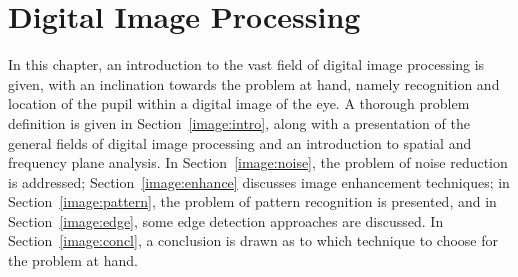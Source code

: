 
\chapter{Digital Image Processing}
\label{image}

In this chapter, an introduction to the vast field of digital image
processing is given, with an inclination towards the problem at hand,
namely recognition and location of the pupil within a digital image of
the eye.  A thorough problem definition is given in
Section~\ref{image:intro}, along with a presentation of the general
fields of digital image processing and an introduction to spatial and
frequency plane analysis.  In Section~\ref{image:noise}, the problem
of noise reduction is addressed; Section~\ref{image:enhance} discusses
image enhancement techniques; in Section~\ref{image:pattern}, the
problem of pattern recognition is presented, and in
Section~\ref{image:edge}, some edge detection approaches are
discussed.  In Section~\ref{image:concl}, a conclusion is drawn as to
which technique to choose for the problem at hand.







